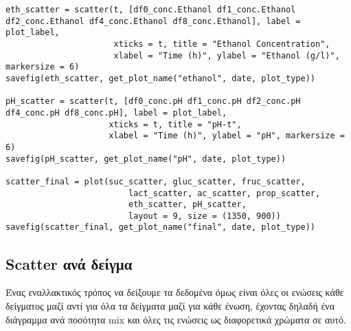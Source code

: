 \documentclass[11pt]{article}
\begin{document}
\begin{verbatim}
eth_scatter = scatter(t, [df0_conc.Ethanol df1_conc.Ethanol df2_conc.Ethanol df4_conc.Ethanol df8_conc.Ethanol], label = plot_label,
                      xticks = t, title = "Ethanol Concentration",
                      xlabel = "Time (h)", ylabel = "Ethanol (g/l)", markersize = 6)
savefig(eth_scatter, get_plot_name("ethanol", date, plot_type))

pH_scatter = scatter(t, [df0_conc.pH df1_conc.pH df2_conc.pH df4_conc.pH df8_conc.pH], label = plot_label,
                     xticks = t, title = "pH-t",
                     xlabel = "Time (h)", ylabel = "pH", markersize = 6)
savefig(pH_scatter, get_plot_name("pH", date, plot_type))

scatter_final = plot(suc_scatter, gluc_scatter, fruc_scatter,
                         lact_scatter, ac_scatter, prop_scatter,
                         eth_scatter, pH_scatter,
                         layout = 9, size = (1350, 900))
savefig(scatter_final, get_plot_name("final", date, plot_type))

\end{verbatim}

\subsection{Scatter ανά δείγμα}
\label{sec:org83abc51}
Ένας εναλλακτικός τρόπος να δείξουμε τα δεδομένα όμως είναι όλες οι ενώσεις κάθε δείγματος μαζί αντί για όλα τα δείγματα μαζί για κάθε ένωση, έχοντας δηλαδή ένα διάγραμμα ανά ποσότητα mix και όλες τις ενώσεις ως διαφορετικά χρώματα σε αυτό.
\end{document}
